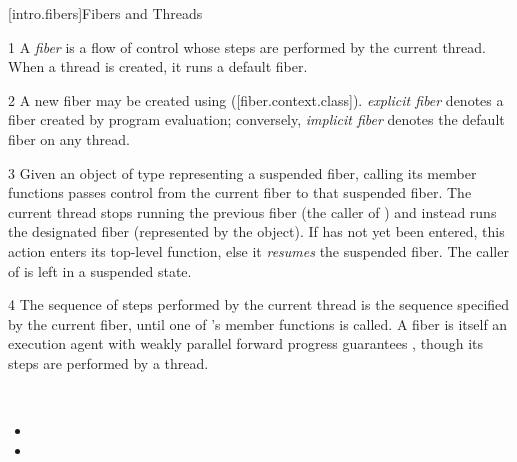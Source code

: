 
\setcounter{section}{6}
\setcounter{subsection}{9}
\setcounter{subsubsection}{2}
\setcounter{secnumdepth}{4}

[intro.fibers]{Fibers and Threads}

1 A \emph{fiber} is a flow of control whose steps are performed by the current
thread. When a thread is created, it runs a default fiber.

2 A new fiber may be created using \fiber ([fiber.context.class]).
\emph{explicit fiber} denotes a fiber created by program evaluation;
conversely, \emph{implicit fiber} denotes the default fiber on any
thread.

3 Given an object of type \fiber representing a suspended fiber, calling
its \anyresume member functions passes control from the current fiber to that
suspended fiber. The current thread stops running the previous fiber (the
caller of \anyresume) and instead runs the designated fiber (represented by
the \fiber object). If  has not yet been entered,
this action enters its top-level function, else it \emph{resumes} the suspended
fiber. The caller of \anyresume is left in a suspended state.

4 The sequence of steps performed by the current thread is the sequence
specified by the current fiber, until one of \fiber's \anyresume member
functions is called. A fiber is itself an execution agent with weakly parallel
forward progress guarantees , though its steps are
performed by a thread.


\\
\begin{itemize}
    \item {}
    \item {}
\end{itemize}


